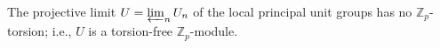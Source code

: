 The projective limit $U = \varprojlim_n U_n$ of the local principal unit groups has no $\mathbb{Z}_p$-torsion; i.e., $U$ is a torsion-free $\mathbb{Z}_p$-module.

